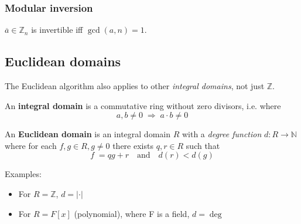 \documentclass[a4paper]{scrartcl}
\newcommand\N{\mathbb N}
\newcommand\Z{\mathbb Z}
\begin{document}
\subsubsection{Modular inversion}

$\overline a\in\Z_n$ is invertible iff $\gcd(a,n)=1$.

\subsection{Euclidean domains}

The Euclidean algorithm also applies to other \textit{integral domains}, not just $\Z$.

An \textbf{integral domain} is a commutative ring without zero divisors, i.e. where
\[a,b\neq0\;\Rightarrow\;a\cdot b\neq0\]

An \textbf{Euclidean domain} is an integral domain $R$ with a \textit{degree function}
$d: R\rightarrow \N$ where for each $f,g\in R, g\neq0$ there
exists $q,r\in R$ such that \[f\;=qg+r\quad\text{and}\quad d(r)<d(g)\]

Examples:\begin{itemize}
    \item For $R=\Z$, $d = |\cdot|$
    \item For $R=F[x]$ (polynomial), where F is a field, $d=\deg$
\end{itemize}
\end{document}
